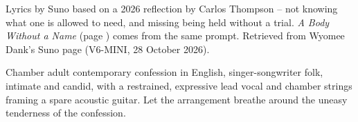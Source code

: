 
\label{sec:what-im-allowed-to-need}
\begin{notes}
Lyrics by Suno based on a 2026 reflection by Carlos Thompson -- not knowing what one is allowed to need, and missing being held without a trial. \emph{A Body Without a Name} (page \pageref{sec:a-body-without-a-name}) comes from the same prompt. Retrieved from Wyomee Dank's Suno page (V6-MINI, 28 October 2026).
\end{notes}
\begin{style}
Chamber adult contemporary confession in English, singer-songwriter folk, intimate and candid, with a restrained, expressive lead vocal and chamber strings framing a spare acoustic guitar. Let the arrangement breathe around the uneasy tenderness of the confession.
\end{style}
